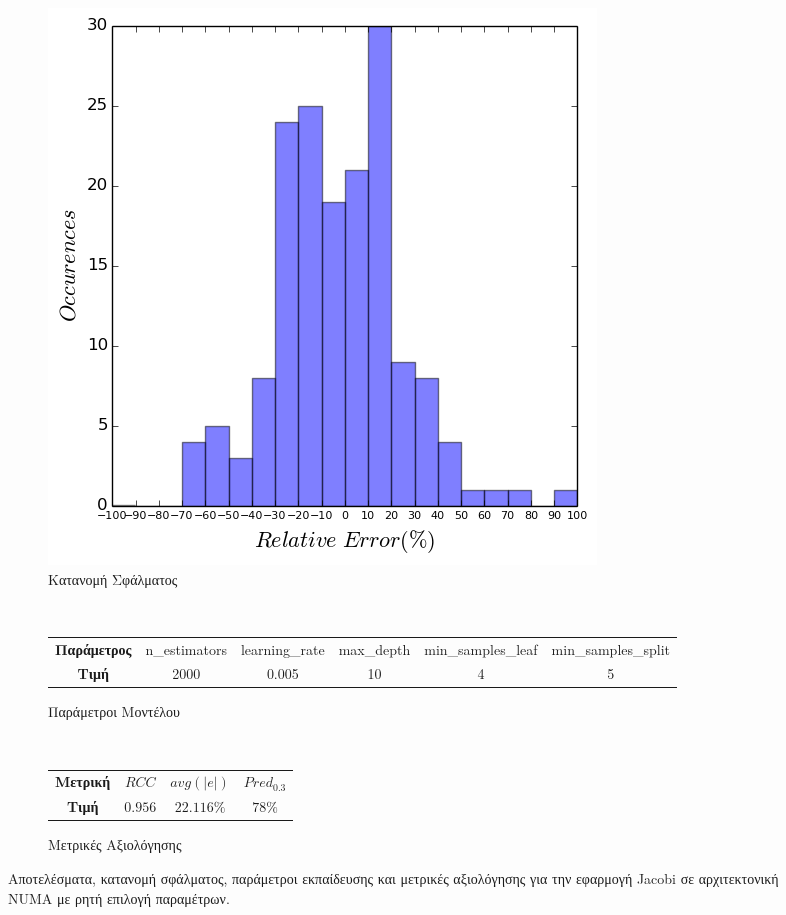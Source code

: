 \begin{figure}[ht]
\begin{subfigure}[b]{0.47\textwidth}
        \includegraphics[width=\textwidth]{./images/NB+cg_mfs_NUMA/jacobi_err_dist.png}
        \caption{Κατανομή Σφάλματος}
    \end{subfigure} 
    \\[0.2cm]
    \begin{subfigure}[b]{\textwidth}
   	 	\scriptsize
		\begin{tabular}{c||c|c|c|c|c}
			\textbf{Παράμετρος} & n\_estimators & learning\_rate & max\_depth & min\_samples\_leaf & min\_samples\_split \\
			\textbf{Τιμή}       &       2000        &  0.005          & 10          &  4                  &    5
		\end{tabular}
		\caption{Παράμετροι Μοντέλου}
    \end{subfigure}
    \\[0.2cm]
    \begin{subfigure}[b]{\textwidth}
    		\centering
   	 	\scriptsize
		\begin{tabular}{c||c|c|c}
			\textbf{Μετρική} & $RCC$ &   $avg(|e|)$ & $Pred_{0.3}$  \\
			\textbf{Τιμή}  &  $0.956$   &      $22.116\%
			$        &  $78\%$                                         
		\end{tabular}
		\caption{Μετρικές Αξιολόγησης}
    \end{subfigure}
    
        \caption{Αποτελέσματα, κατανομή σφάλματος, παράμετροι εκπαίδευσης και μετρικές αξιολόγησης για την εφαρμογή Jacobi σε αρχιτεκτονική NUMA με ρητή επιλογή παραμέτρων.}
    \label{fig:NB_cg_mfs_jacobi_NUMA}
\end{figure}
